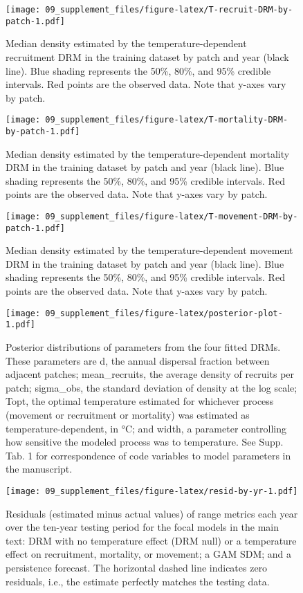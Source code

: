 \documentclass[
  portrait]{article}
\begin{document}
\begin{figure}
\centering
\texttt{[image: 09\_supplement\_files/figure-latex/T-recruit-DRM-by-patch-1.pdf]}
\caption{\label{fig:T-recruit-DRM-by-patch}Median density estimated by the temperature-dependent recruitment DRM in the training dataset by patch and year (black line). Blue shading represents the 50\%, 80\%, and 95\% credible intervals. Red points are the observed data. Note that y-axes vary by patch.}
\end{figure}

\begin{figure}
\centering
\texttt{[image: 09\_supplement\_files/figure-latex/T-mortality-DRM-by-patch-1.pdf]}
\caption{\label{fig:T-mortality-DRM-by-patch}Median density estimated by the temperature-dependent mortality DRM in the training dataset by patch and year (black line). Blue shading represents the 50\%, 80\%, and 95\% credible intervals. Red points are the observed data. Note that y-axes vary by patch.}
\end{figure}

\begin{figure}
\centering
\texttt{[image: 09\_supplement\_files/figure-latex/T-movement-DRM-by-patch-1.pdf]}
\caption{\label{fig:T-movement-DRM-by-patch}Median density estimated by the temperature-dependent movement DRM in the training dataset by patch and year (black line). Blue shading represents the 50\%, 80\%, and 95\% credible intervals. Red points are the observed data. Note that y-axes vary by patch.}
\end{figure}

\begin{figure}
\centering
\texttt{[image: 09\_supplement\_files/figure-latex/posterior-plot-1.pdf]}
\caption{\label{fig:posterior-plot}Posterior distributions of parameters from the four fitted DRMs. These parameters are d, the annual dispersal fraction between adjacent patches; mean\_recruits, the average density of recruits per patch; sigma\_obs, the standard deviation of density at the log scale; Topt, the optimal temperature estimated for whichever process (movement or recruitment or mortality) was estimated as temperature-dependent, in °C; and width, a parameter controlling how sensitive the modeled process was to temperature. See Supp. Tab. 1 for correspondence of code variables to model parameters in the manuscript.}
\end{figure}

\begin{figure}
\centering
\texttt{[image: 09\_supplement\_files/figure-latex/resid-by-yr-1.pdf]}
\caption{\label{fig:resid-by-yr}Residuals (estimated minus actual values) of range metrics each year over the ten-year testing period for the focal models in the main text: DRM with no temperature effect (DRM null) or a temperature effect on recruitment, mortality, or movement; a GAM SDM; and a persistence forecast. The horizontal dashed line indicates zero residuals, i.e., the estimate perfectly matches the testing data.}
\end{figure}
\end{document}
